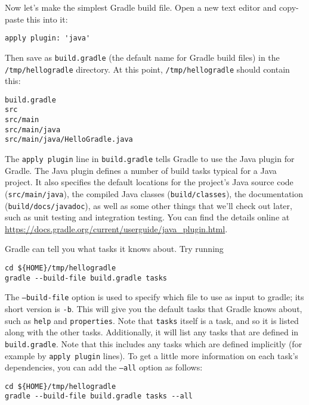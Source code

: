 Now let's make the simplest Gradle build file. Open a new text editor and copy-paste this into it:
\begin{lstlisting}[style=basic,style=bash]
apply plugin: 'java'
\end{lstlisting}
Then save as \texttt{build.gradle} (the default name for Gradle build files) in the \texttt{\mytilde{}/tmp/hellogradle} directory. At this point, \texttt{\mytilde{}/tmp/hellogradle} should contain this:
\begin{lstlisting}[style=basic,style=bash]
build.gradle
src
src/main
src/main/java
src/main/java/HelloGradle.java
\end{lstlisting}

The \texttt{apply plugin} line in \texttt{build.gradle} tells Gradle to use the Java plugin for Gradle. The Java plugin defines a number of build tasks typical for a Java project. It also specifies the default locations for the project's Java source code (\texttt{src/main/java}), the compiled Java classes (\texttt{build/classes}), the documentation (\texttt{build/docs/javadoc}), as well as some other things that we'll check out later, such as unit testing and integration testing. You can find the details online at \url{https://docs.gradle.org/current/userguide/java_plugin.html}.

Gradle can tell you what tasks it knows about. Try running
\begin{lstlisting}[style=basic,style=bash]
cd ${HOME}/tmp/hellogradle
gradle --build-file build.gradle tasks
\end{lstlisting} %
The \texttt{--build-file} option is used to specify which file to use as input to gradle; its short version is \texttt{-b}. This will give you the default tasks that Gradle knows about, such as \texttt{help} and \texttt{properties}. Note that \texttt{tasks} itself is a task, and so it is listed along with the other tasks. Additionally, it will list any tasks that are defined in \texttt{build.gradle}. Note that this includes any tasks which are defined implicitly (for example by \texttt{apply plugin} lines). To get a little more information on each task's dependencies, you can add the \texttt{--all} option as follows:
\begin{lstlisting}[style=basic,style=bash]
cd ${HOME}/tmp/hellogradle
gradle --build-file build.gradle tasks --all
\end{lstlisting} %

